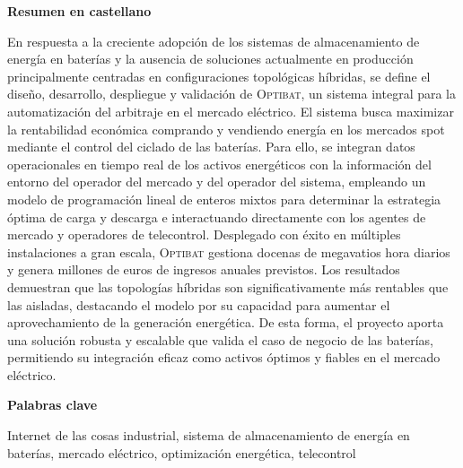 \newpage

\thispagestyle{empty}

\begin{center}
  {\bf \huge Resumen en castellano}
\end{center}

\vspace{1cm}

En respuesta a la creciente adopción de los sistemas de almacenamiento de energía en baterías y la ausencia de soluciones actualmente en producción principalmente centradas en configuraciones topológicas híbridas, se define el diseño, desarrollo, despliegue y validación de \textsc{Optibat}, un sistema integral para la automatización del arbitraje en el mercado eléctrico. El sistema busca maximizar la rentabilidad económica comprando y vendiendo energía en los mercados spot mediante el control del ciclado de las baterías. Para ello, se integran datos operacionales en tiempo real de los activos energéticos con la información del entorno del operador del mercado y del operador del sistema, empleando un modelo de programación lineal de enteros mixtos para determinar la estrategia óptima de carga y descarga e interactuando directamente con los agentes de mercado y operadores de telecontrol. Desplegado con éxito en múltiples instalaciones a gran escala, \textsc{Optibat} gestiona docenas de megavatios hora diarios y genera millones de euros de ingresos anuales previstos. Los resultados demuestran que las topologías híbridas son significativamente más rentables que las aisladas, destacando el modelo por su capacidad para aumentar el aprovechamiento de la generación energética. De esta forma, el proyecto aporta una solución robusta y escalable que valida el caso de negocio de las baterías, permitiendo su integración eficaz como activos óptimos y fiables en el mercado eléctrico.

\vspace{1cm}

\begin{center}
  {\bf \large Palabras clave}
\end{center}

\vspace{0.5cm}

Internet de las cosas industrial, sistema de almacenamiento de energía en baterías, mercado eléctrico, optimización energética, telecontrol
